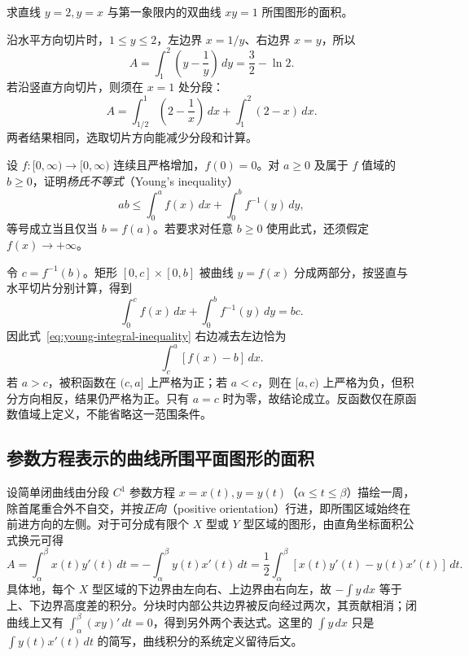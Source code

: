\documentclass[UTF8,12pt,a4paper,fontset=fandol]{ctexbook}
\begin{document}
\begin{example}
\label{ex:area-line-hyperbola}
求直线 $y=2,y=x$ 与第一象限内的双曲线 $xy=1$ 所围图形的面积。
\end{example}
\begin{solve}
沿水平方向切片时，$1\leq y\leq2$，左边界 $x=1/y$、右边界 $x=y$，所以
\[
    A=\int_1^2\left(y-\frac1y\right)\,dy=\frac32-\ln2.
\]
若沿竖直方向切片，则须在 $x=1$ 处分段：
\[
    A=\int_{1/2}^1\left(2-\frac1x\right)\,dx+\int_1^2(2-x)\,dx.
\]
两者结果相同，选取切片方向能减少分段和计算。
\end{solve}

\begin{example}
\label{ex:young-inequality-integral-form}
设 $f:[0,\infty)\to[0,\infty)$ 连续且严格增加，$f(0)=0$。对 $a\geq0$ 及属于 $f$ 值域的 $b\geq0$，证明\emph{杨氏不等式}（Young's inequality）
\begin{equation}
    ab\leq\int_0^af(x)\,dx+\int_0^bf^{-1}(y)\,dy,
    \label{eq:young-integral-inequality}
\end{equation}
等号成立当且仅当 $b=f(a)$。若要求对任意 $b\geq0$ 使用此式，还须假定 $f(x)\to+\infty$。
\end{example}
\begin{solve}
令 $c=f^{-1}(b)$。矩形 $[0,c]\times[0,b]$ 被曲线 $y=f(x)$ 分成两部分，按竖直与水平切片分别计算，得到
\[
    \int_0^cf(x)\,dx+\int_0^bf^{-1}(y)\,dy=bc.
\]
因此式~\eqref{eq:young-integral-inequality} 右边减去左边恰为
\[
    \int_c^a[f(x)-b]\,dx.
\]
若 $a>c$，被积函数在 $(c,a]$ 上严格为正；若 $a<c$，则在 $[a,c)$ 上严格为负，但积分方向相反，结果仍严格为正。只有 $a=c$ 时为零，故结论成立。反函数仅在原函数值域上定义，不能省略这一范围条件。
\end{solve}

\subsection{参数方程表示的曲线所围平面图形的面积}
\label{subsec:plane-areas-enclosed-by-parametric-curves}

设简单闭曲线由分段 $C^1$ 参数方程 $x=x(t),y=y(t)$（$\alpha\leq t\leq\beta$）描绘一周，除首尾重合外不自交，并按\emph{正向}（positive orientation）行进，即所围区域始终在前进方向的左侧。对于可分成有限个 $X$ 型或 $Y$ 型区域的图形，由直角坐标面积公式换元可得
\begin{equation}
    A=\int_\alpha^\beta x(t)y'(t)\,dt
     =-\int_\alpha^\beta y(t)x'(t)\,dt
     =\frac12\int_\alpha^\beta[x(t)y'(t)-y(t)x'(t)]\,dt.
    \label{eq:parametric-enclosed-area}
\end{equation}
具体地，每个 $X$ 型区域的下边界由左向右、上边界由右向左，故 $-\int y\,dx$ 等于上、下边界高度差的积分。分块时内部公共边界被反向经过两次，其贡献相消；闭曲线上又有 $\int_\alpha^\beta(xy)'\,dt=0$，得到另外两个表达式。这里的 $\int y\,dx$ 只是 $\int y(t)x'(t)\,dt$ 的简写，曲线积分的系统定义留待后文。
\end{document}
